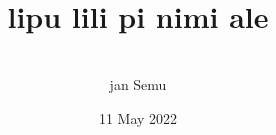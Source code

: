 \documentclass[statementpaper,oneside,article,14pt]{memoir}
\newcommand{\BackgroundPic}[1]{%
\put(0,0){%
\parbox[b][\paperheight]{\paperwidth}{%
\vfill
\centering
{\transparent{0.4} \texttt{[image: \#1]}}%
\vfill
}}}
\begin{document}
\newcommand{\nimi}[3]{\item[{\sitpon#1} #2] #3}


\title{{} \\ lipu lili pi nimi ale}
\author{{\sitpon󱤑󱦐󱥚󱦜󱤻󱦜󱦑} \\ jan Semu}
\date{11 May 2022}

\begingroup
\let\cleardoublepage\clearpage


\begin{titlingpage}
\maketitle


\end{titlingpage}

\endgroup

\pagestyle{empty}


\end{document}
